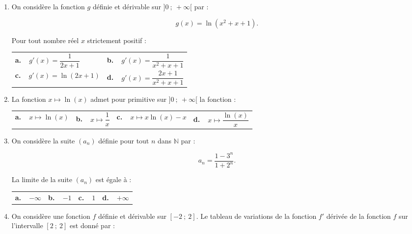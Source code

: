 \documentclass[10pt,a4paper]{article}
\newcommand{\N}{\mathbb{N}}
\begin{document}
\begin{enumerate}
\item On considère  la fonction $g$ définie et dérivable sur $]0~;~+ \infty[$ par :

\[g(x) = \ln \left(x^2 + x + 1\right).\]

Pour tout nombre réel $x$ strictement positif :

\begin{center}
\begin{tabularx}{\linewidth}{X X}
\textbf{a.~~}$g'(x) = \dfrac{1}{2x + 1}$&\textbf{b.~~}$g'(x) = \dfrac{1}{x^2 + x + 1}$\\[8pt]
\textbf{c.~~}$g'(x) = \ln (2x + 1)$&\textbf{d.~~}$g'(x) = \dfrac{2x + 1}{x^2 + x + 1}$
\end{tabularx}
\end{center}

\item La fonction $x \longmapsto \ln (x)$ admet pour primitive sur $]0~;~+ \infty[$ la fonction :

\begin{center}
\begin{tabularx}{\linewidth}{*{4}{X} }
\textbf{a.~~}$x \longmapsto \ln (x)$&\textbf{b.~~}$x \longmapsto \dfrac{1}{x}$&\textbf{c.~~}$x \longmapsto x \ln (x) - x$&\textbf{d.~~}$x \longmapsto \dfrac{\ln (x)}{x}$
\end{tabularx}
\end{center}
\item On considère la suite $\left(a_n\right)$ définie  pour tout $n$ dans $\N$ par :

\[a_n = \dfrac{1 - 3^n}{1 + 2^n}.\]

La limite de la suite $\left(a_n\right)$ est égale à :

\begin{center}
\begin{tabularx}{\linewidth}{*{4}{X} }
\textbf{a.~~}$- \infty$&\textbf{b.~~}$- 1$&\textbf{c.~~}$1$&\textbf{d.~~}$+ \infty$
\end{tabularx}
\end{center}
\item 
On considère une fonction $f$ définie et dérivable sur $[-2~;~2]$. Le tableau de variations de la fonction $f'$ dérivée de la fonction $f$ sur l'intervalle $[2~;~2]$ est donné par :


\end{enumerate}
\end{document}
